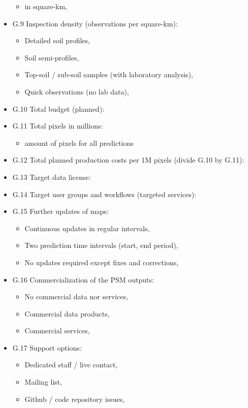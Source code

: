 \documentclass[graybox,natbib,nospthms,UStrade]{svmono}
\providecommand{\tightlist}{%
  \setlength{\itemsep}{0pt}\setlength{\parskip}{0pt}}
\providecommand{\tightlist}{\setlength{\itemsep}{0pt}\setlength{\parskip}{0pt}}
\begin{document}
\begin{itemize}
  \begin{itemize}
  \tightlist
  \item
    in square-km,
  \end{itemize}
\item
  G.9 Inspection density (observations per square-km):

  \begin{itemize}
  \tightlist
  \item
    Detailed soil profiles,
  \item
    Soil semi-profiles,
  \item
    Top-soil / sub-soil samples (with laboratory analysis),
  \item
    Quick observations (no lab data),
  \end{itemize}
\item
  G.10 Total budget (planned):
\item
  G.11 Total pixels in millions:

  \begin{itemize}
  \tightlist
  \item
    amount of pixels for all predictions
  \end{itemize}
\item
  G.12 Total planned production costs per 1M pixels (divide G.10 by G.11):
\item
  G.13 Target data license:
\item
  G.14 Target user groups and workflows (targeted services):
\item
  G.15 Further updates of maps:

  \begin{itemize}
  \tightlist
  \item
    Continuous updates in regular intervals,
  \item
    Two prediction time intervals (start, end period),
  \item
    No updates required except fixes and corrections,
  \end{itemize}
\item
  G.16 Commercialization of the PSM outputs:

  \begin{itemize}
  \tightlist
  \item
    No commercial data nor services,
  \item
    Commercial data products,
  \item
    Commercial services,
  \end{itemize}
\item
  G.17 Support options:

  \begin{itemize}
  \tightlist
  \item
    Dedicated staff / live contact,
  \item
    Mailing list,
  \item
    Github / code repository issues,
  \end{itemize}
\end{itemize}
\end{document}
